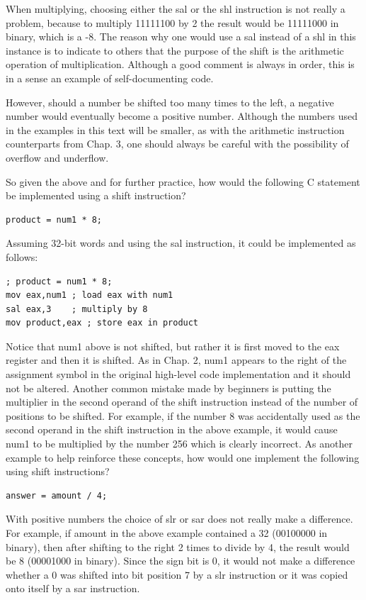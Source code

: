 \documentclass[10pt]{book}
\begin{document}
When multiplying, choosing either the sal or the shl instruction is not really a problem, because to multiply 11111100 by 2 the result would be 11111000 in binary, which is a -8. The reason why one would use a sal instead of a shl in this instance is to indicate to others that the purpose of the shift is the arithmetic operation of multiplication. Although a good comment is always in order, this is in a sense an example of self-documenting code.

However, should a number be shifted too many times to the left, a negative number would eventually become a positive number. Although the numbers used in the examples in this text will be smaller, as with the arithmetic instruction counterparts from Chap. 3, one should always be careful with the possibility of overflow and underflow.

So given the above and for further practice, how would the following C statement be implemented using a shift instruction?

\begin{verbatim}
product = num1 * 8;
\end{verbatim}

Assuming 32-bit words and using the sal instruction, it could be implemented as follows:

\begin{verbatim}
; product = num1 * 8;
mov eax,num1 ; load eax with num1
sal eax,3    ; multiply by 8
mov product,eax ; store eax in product
\end{verbatim}

Notice that num1 above is not shifted, but rather it is first moved to the eax register and then it is shifted. As in Chap. 2, num1 appears to the right of the assignment symbol in the original high-level code implementation and it should not be altered. Another common mistake made by beginners is putting the multiplier in the second operand of the shift instruction instead of the number of positions to be shifted. For example, if the number 8 was accidentally used as the second operand in the shift instruction in the above example, it would cause num1 to be multiplied by the number 256 which is clearly incorrect. As another example to help reinforce these concepts, how would one implement the following using shift instructions?

\begin{verbatim}
answer = amount / 4;
\end{verbatim}

With positive numbers the choice of slr or sar does not really make a difference. For example, if amount in the above example contained a 32 (00100000 in binary), then after shifting to the right 2 times to divide by 4, the result would be 8 (00001000 in binary). Since the sign bit is 0, it would not make a difference whether a 0 was shifted into bit position 7 by a slr instruction or it was copied onto itself by a sar instruction.
\end{document}
